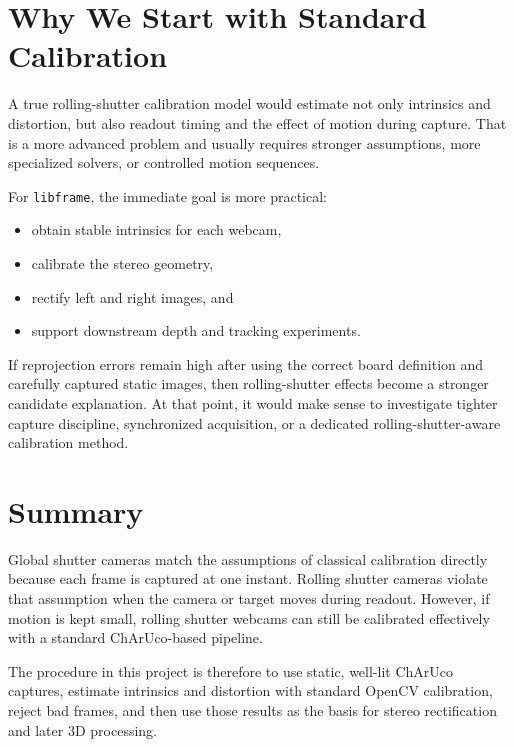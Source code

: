 \documentclass[11pt]{article}
\begin{document}
\section{Why We Start with Standard Calibration}

A true rolling-shutter calibration model would estimate not only intrinsics
and distortion, but also readout timing and the effect of motion during
capture. That is a more advanced problem and usually requires stronger
assumptions, more specialized solvers, or controlled motion sequences.

For \texttt{libframe}, the immediate goal is more practical:

\begin{itemize}
\item obtain stable intrinsics for each webcam,
\item calibrate the stereo geometry,
\item rectify left and right images, and
\item support downstream depth and tracking experiments.
\end{itemize}

If reprojection errors remain high after using the correct board definition
and carefully captured static images, then rolling-shutter effects become a
stronger candidate explanation. At that point, it would make sense to
investigate tighter capture discipline, synchronized acquisition, or a
dedicated rolling-shutter-aware calibration method.

\section{Summary}

Global shutter cameras match the assumptions of classical calibration
directly because each frame is captured at one instant. Rolling shutter
cameras violate that assumption when the camera or target moves during
readout. However, if motion is kept small, rolling shutter webcams can still
be calibrated effectively with a standard ChArUco-based pipeline.

The procedure in this project is therefore to use static, well-lit ChArUco
captures, estimate intrinsics and distortion with standard OpenCV
calibration, reject bad frames, and then use those results as the basis for
stereo rectification and later 3D processing.
\end{document}
